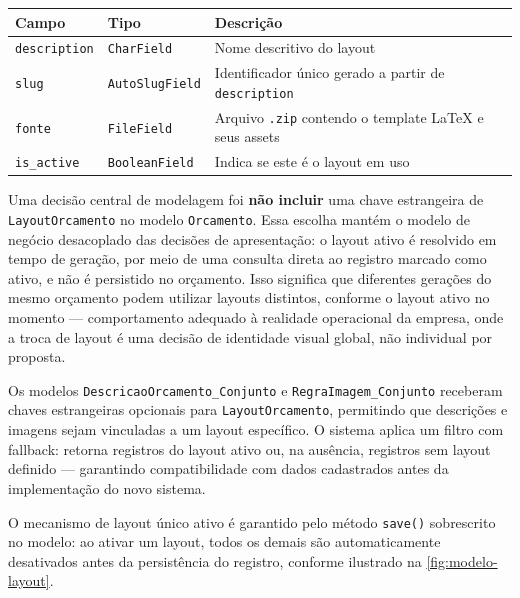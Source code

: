 \begin{quadro}[htb]
    \caption{\label{qdr:layout-orcamento}Campos do modelo \texttt{LayoutOrcamento}}
    \begin{tabular}{|l|l|p{7cm}|}
        \hline
        \textbf{Campo} & \textbf{Tipo} & \textbf{Descrição} \\
        \hline
        \texttt{description} & \texttt{CharField} & Nome descritivo do layout \\
        \hline
        \texttt{slug} & \texttt{AutoSlugField} & Identificador único gerado a partir de \texttt{description} \\
        \hline
        \texttt{fonte} & \texttt{FileField} & Arquivo \texttt{.zip} contendo o template LaTeX e seus assets \\
        \hline
        \texttt{is\_active} & \texttt{BooleanField} & Indica se este é o layout em uso \\
        \hline
    \end{tabular}
\end{quadro}

Uma decisão central de modelagem foi \textbf{não incluir} uma chave estrangeira de
\texttt{LayoutOrcamento} no modelo \texttt{Orcamento}. Essa escolha mantém o modelo de negócio
desacoplado das decisões de apresentação: o layout ativo é resolvido em tempo de geração,
por meio de uma consulta direta ao registro marcado como ativo, e não é persistido no orçamento.
Isso significa que diferentes gerações do mesmo orçamento podem utilizar layouts distintos,
conforme o layout ativo no momento --- comportamento adequado à realidade operacional da empresa,
onde a troca de layout é uma decisão de identidade visual global, não individual por proposta.

Os modelos \texttt{DescricaoOrcamento\_Conjunto} e \texttt{RegraImagem\_Conjunto} receberam
chaves estrangeiras opcionais para \texttt{LayoutOrcamento}, permitindo que descrições e imagens
sejam vinculadas a um layout específico. O sistema aplica um filtro com fallback: retorna registros
do layout ativo ou, na ausência, registros sem layout definido --- garantindo compatibilidade com
dados cadastrados antes da implementação do novo sistema.

O mecanismo de layout único ativo é garantido pelo método \texttt{save()} sobrescrito no modelo:
ao ativar um layout, todos os demais são automaticamente desativados antes da persistência do
registro, conforme ilustrado na \autoref{fig:modelo-layout}.

